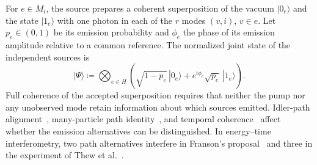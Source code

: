 \documentclass[10pt]{article}
\numberwithin{equation}{section}
\theoremstyle{definition}
\begin{document}
For $e\in M_i$, the source prepares a coherent superposition of the vacuum $|0_e\rangle$ and the state $|1_e\rangle$ with one photon in each of the $r$ modes $(v,i)$, $v\in e$. Let $p_e\in(0,1)$ be its emission probability and $\phi_e$ the phase of its emission amplitude relative to a common reference. The normalized joint state of the independent sources is
\begin{equation}
 |\Psi\rangle\coloneqq\bigotimes_{e\in H}\left(\sqrt{1-p_e}\,|0_e\rangle+e^{\mathrm{i}\phi_e}\sqrt{p_e}\,|1_e\rangle\right).
 \label{eq:normalized-source-state}
\end{equation}
Full coherence of the accepted superposition requires that neither the pump nor any unobserved mode retain information about which sources emitted. Idler-path alignment~\cite{ZouWangMandel1991}, many-particle path identity~\cite{Lahiri2018}, and temporal coherence~\cite{JhaEtAl2008} affect whether the emission alternatives can be distinguished. In energy--time interferometry, two path alternatives interfere in Franson's proposal~\cite{Franson1989} and three in the experiment of Thew et al.~\cite{ThewEtAl2004}.
\end{document}
